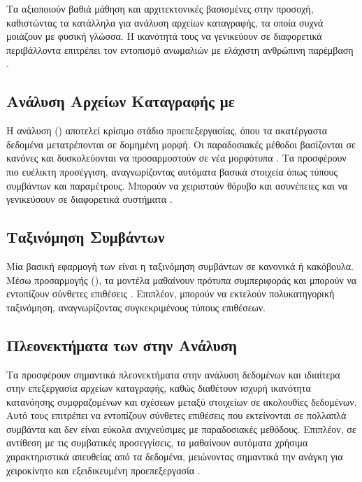 Τα  αξιοποιούν βαθιά μάθηση και αρχιτεκτονικές βασισμένες στην προσοχή, καθιστώντας τα κατάλληλα για ανάλυση αρχείων καταγραφής, τα οποία συχνά μοιάζουν με φυσική γλώσσα. Η ικανότητά τους να γενικεύουν σε διαφορετικά περιβάλλοντα επιτρέπει τον εντοπισμό ανωμαλιών με ελάχιστη ανθρώπινη παρέμβαση \cite{zhang2023llmsecurity}.

\subsection{Ανάλυση Αρχείων Καταγραφής με }

Η ανάλυση () αποτελεί κρίσιμο στάδιο προεπεξεργασίας, όπου τα ακατέργαστα δεδομένα μετατρέπονται σε δομημένη μορφή. Οι παραδοσιακές μέθοδοι βασίζονται σε κανόνες και δυσκολεύονται να προσαρμοστούν σε νέα μορφότυπα \cite{he2017drain}. Τα  προσφέρουν πιο ευέλικτη προσέγγιση, αναγνωρίζοντας αυτόματα βασικά στοιχεία όπως τύπους συμβάντων και παραμέτρους. Μπορούν να χειριστούν θόρυβο και ασυνέπειες και να γενικεύσουν σε διαφορετικά συστήματα \cite{liu2023logllm}.

\subsection{Ταξινόμηση Συμβάντων}

Μία βασική εφαρμογή των  είναι η ταξινόμηση συμβάντων σε κανονικά ή κακόβουλα. Μέσω προσαρμογής (), τα μοντέλα μαθαίνουν πρότυπα συμπεριφοράς και μπορούν να εντοπίζουν σύνθετες επιθέσεις \cite{nguyen2018deep}. Επιπλέον, μπορούν να εκτελούν πολυκατηγορική ταξινόμηση, αναγνωρίζοντας συγκεκριμένους τύπους επιθέσεων.

\subsection{Πλεονεκτήματα των  στην Ανάλυση}

Τα  προσφέρουν σημαντικά πλεονεκτήματα στην ανάλυση δεδομένων και ιδιαίτερα στην επεξεργασία αρχείων καταγραφής, καθώς διαθέτουν ισχυρή ικανότητα κατανόησης συμφραζομένων και σχέσεων μεταξύ στοιχείων σε ακολουθίες δεδομένων. Αυτό τους επιτρέπει να εντοπίζουν σύνθετες επιθέσεις που εκτείνονται σε πολλαπλά συμβάντα και δεν είναι εύκολα ανιχνεύσιμες με παραδοσιακές μεθόδους. Επιπλέον, σε αντίθεση με τις συμβατικές προσεγγίσεις, τα  μαθαίνουν αυτόματα χρήσιμα χαρακτηριστικά απευθείας από τα δεδομένα, μειώνοντας σημαντικά την ανάγκη για χειροκίνητο  και εξειδικευμένη προεπεξεργασία \cite{brown2020language}.

